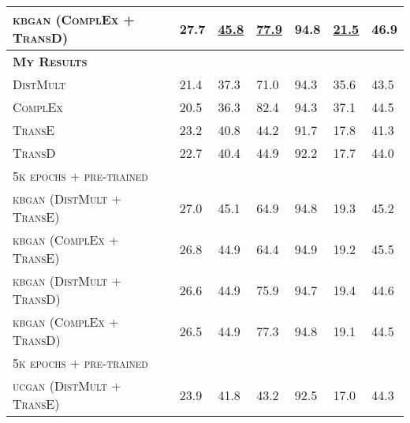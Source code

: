\begin{table}[h]
\begin{tabular}{lllllll}
        \textsc{kbgan} (\textsc{ComplEx} + \textsc{TransD})   
        & 27.7 & \textbf{\underline{45.8}} & \underline{77.9}
        & 94.8 & \underline{21.5} & 46.9\\
        
        \midrule
        
        \midrule
         
        \textbf{\textsc{My Results}} 
        &  &  &  &  &  & \\
        
       \textsc{DistMult}  
        & 21.4 & 37.3 & 71.0 & 94.3 & 35.6 & 43.5 \\
        
        \textsc{ComplEx}   
        & 20.5 & 36.3 & 82.4 & 94.3 & 37.1 & 44.5 \\
         
        \textsc{TransE}    
        & 23.2 & 40.8 & 44.2 & 91.7 & 17.8 & 41.3 \\
        
        \textsc{TransD}    
        & 22.7 & 40.4 & 44.9 & 92.2 & 17.7 & 44.0 \\ 
        
        \midrule
          
          \textsc{5k epochs + pre-trained} 
          &  &  &  &  &  & \\
          
          \textsc{kbgan} (\textsc{DistMult} + \textsc{TransE})  
          & 27.0  & 45.1 & 64.9 & 94.8 & 19.3 & 45.2 \\
          
          \textsc{kbgan} (\textsc{ComplEx} + \textsc{TransE})  
          & 26.8  & 44.9 & 64.4 & 94.9 & 19.2 & 45.5 \\
          
          \textsc{kbgan} (\textsc{DistMult} + \textsc{TransD})  
          & 26.6  & 44.9 & 75.9 & 94.7 & 19.4 & 44.6 \\

          \textsc{kbgan} (\textsc{ComplEx} + \textsc{TransD})  
          & 26.5 & 44.9 & 77.3 & 94.8 & 19.1 & 44.5 \\
          
          \midrule
          
          \textsc{5k epochs + pre-trained} 
          &  &  &  &  &  & \\
          
          \textsc{ucgan} (\textsc{DistMult} + \textsc{TransE})  
          & 23.9 & 41.8 & 43.2 & 92.5 & 17.0 & 44.3 \\
          

\end{tabular}
\end{table}
